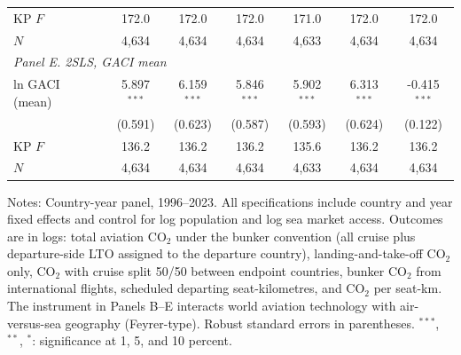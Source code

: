 \documentclass[11pt]{article}
\begin{document}
\begin{table}[htbp]
\begin{threeparttable}
\begin{tabular}{lcccccc}
  KP $F$ & 172.0 & 172.0 & 172.0 & 171.0 & 172.0 & 172.0 \\
  $N$ & 4,634 & 4,634 & 4,634 & 4,633 & 4,634 & 4,634 \\
\midrule
\multicolumn{7}{l}{\textit{Panel E. 2SLS, GACI mean}} \\
  ln GACI (mean) & 5.897$^{***}$ & 6.159$^{***}$ & 5.846$^{***}$ & 5.902$^{***}$ & 6.313$^{***}$ & -0.415$^{***}$ \\
   & (0.591) & (0.623) & (0.587) & (0.593) & (0.624) & (0.122) \\
  KP $F$ & 136.2 & 136.2 & 136.2 & 135.6 & 136.2 & 136.2 \\
  $N$ & 4,634 & 4,634 & 4,634 & 4,633 & 4,634 & 4,634 \\
\bottomrule
\end{tabular}
\begin{tablenotes}[flushleft]
\footnotesize
\item Notes: Country-year panel, 1996--2023. All specifications include country and year fixed effects and control for log population and log sea market access. Outcomes are in logs: total aviation CO$_2$ under the bunker convention (all cruise plus departure-side LTO assigned to the departure country), landing-and-take-off CO$_2$ only, CO$_2$ with cruise split 50/50 between endpoint countries, bunker CO$_2$ from international flights, scheduled departing seat-kilometres, and CO$_2$ per seat-km. The instrument in Panels B--E interacts world aviation technology with air-versus-sea geography (Feyrer-type). Robust standard errors in parentheses. $^{***}$, $^{**}$, $^{*}$: significance at 1, 5, and 10 percent.
\end{tablenotes}
\end{threeparttable}
\end{table}
\end{document}
